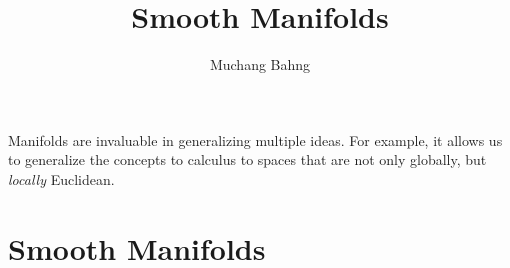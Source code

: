 \documentclass{article}
\theoremstyle{remark}
\theoremstyle{definition}
\begin{document}
\pagestyle{fancy}

\cfoot{\thepage / \pageref{LastPage}}

\title{Smooth Manifolds}
\author{Muchang Bahng}

\maketitle
\tableofcontents
\pagebreak 

Manifolds are invaluable in generalizing multiple ideas. For example, it allows us to generalize the concepts to calculus to spaces that are not only globally, but \textit{locally} Euclidean. 

\section{Smooth Manifolds}
\end{document}
